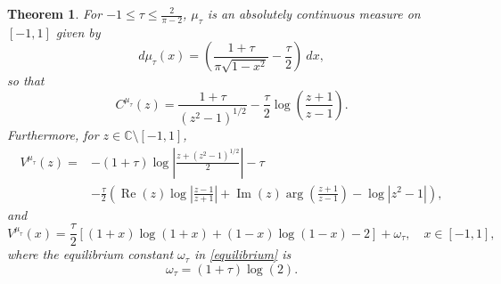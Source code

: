 \documentclass[reqno,11pt]{amsart}
\theoremstyle{plain}
\newtheorem{theorem}{Theorem}[section]
\theoremstyle{definition}
\theoremstyle{remark}
\numberwithin{equation}{section}
\newcommand{\C}{\mathbb{C}}
\begin{document}
\begin{theorem}\label{theorem_case_-1<=tau<=2/(pi-2)}
    For $-1\leq\tau\leq\frac{2}{\pi-2}$, $\mu_\tau$ is an absolutely continuous measure on $[-1,1]$ given by
    \begin{equation}\label{mu_when_-1<=tau_<=/(pi-2)}
        d\mu_\tau(x)=\left(\frac{1+\tau}{\pi\sqrt{1-x^2}}-\frac{\tau}{2}\right)\ dx,
    \end{equation}
so that
\begin{equation}\label{Cauchy_Transform_mu_when_-1<=tau_<=/(pi-2)}
        C^{\mu_\tau}(z)= \frac{1+\tau}{\left( z^2-1\right)^{1/2}}-\frac{\tau}{2}\log\left(\frac{z+1}{z-1}\right).
    \end{equation}
Furthermore, for $z\in \C\setminus [-1,1]$,  
\begin{equation*}
\begin{split}
        V^{\mu_\tau}(z)= & -(1+\tau)\log\left|\frac{z+\left( z^2-1\right)^{1/2}}{2}\right|-\tau  \\
        & -\frac{\tau}{2}\left(\operatorname{Re}(z)\log\left|\frac{z-1}{z+1}\right|+\operatorname{Im}(z)\arg\left(\frac{z+1}{z-1}\right)-\log|z^2-1|\right),
\end{split}
    \end{equation*}
and
\begin{equation}\label{Log_Potential_mu_when_-1<=tau_<=/(pi-2)_[-1,1]}
    V^{\mu_\tau}(x)=\frac{\tau}{2} \left[ (1+x)\log(1+x)+ (1-x)\log(1-x) -2 \right] + \omega_\tau, \quad x\in   [-1,1],
\end{equation}
where the equilibrium constant $\omega_\tau$ in \eqref{equilibrium} is  
\begin{equation}\label{equilibrium_constant_-1<=tau<=2/(pi-2)}
    \omega_\tau=(1+\tau)\log(2).
\end{equation}
\end{theorem}
\end{document}
